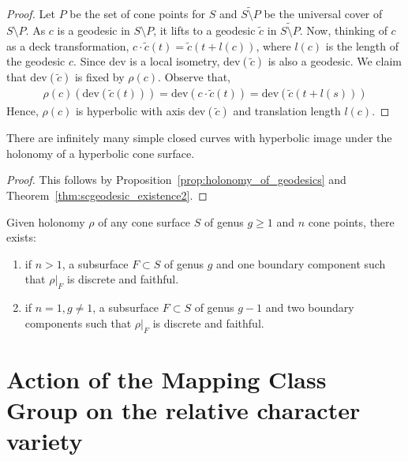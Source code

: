 \begin{proof}
	Let $P$ be the set of cone points for $S$ and $\widetilde{S \setminus P}$ be the universal cover of $S \setminus P$. As $c$ is a geodesic in $S \setminus P$, it lifts to a geodesic $\tilde{c}$ in $\widetilde{S\setminus P}$. Now, thinking of $c$ as a deck transformation, $c \cdot \tilde{c}(t) = \tilde{c}(t+l(c))$, where $l(c)$ is the length of the geodesic $c$. Since dev is a local isometry, $\text{dev}(\tilde{c})$ is also a geodesic. We claim that $\text{dev}(\tilde{c})$ is fixed by $\rho(c)$. Observe that,
	\begin{align*}
		\rho(c)(\text{dev}(\tilde{c}(t))) = \text{dev}(c \cdot \tilde{c}(t))= \text{dev}(\tilde{c}(t + l(s)))
	\end{align*} 
	Hence, $\rho(c)$ is hyperbolic with axis $\text{dev}(\tilde{c})$ and translation length $l(c)$. 
\end{proof}

\begin{cor}
	There are infinitely many simple closed curves with hyperbolic image under the holonomy of a hyperbolic cone surface. 
\end{cor}

\begin{proof}
	This follows by Proposition~\ref{prop:holonomy_of_geodesics} and Theorem~\ref{thm:scgeodesic_existence2}.
\end{proof}

\begin{theorem}
	Given holonomy $\rho$ of any cone surface $S$ of genus $g\geq 1$ and $n$ cone points, there exists:
	\begin{enumerate}
		\item if $n>1$, a subsurface $F \subset S$ of genus $g$ and one boundary component such that $\rho|_F$ is discrete and faithful.
		\item if $n=1, g\neq 1$, a subsurface $F \subset S$ of genus $g-1$ and two boundary components such that $\rho|_F$ is discrete and faithful.
	\end{enumerate}	 
\end{theorem}

\section{Action of the Mapping Class Group on the relative character variety}

